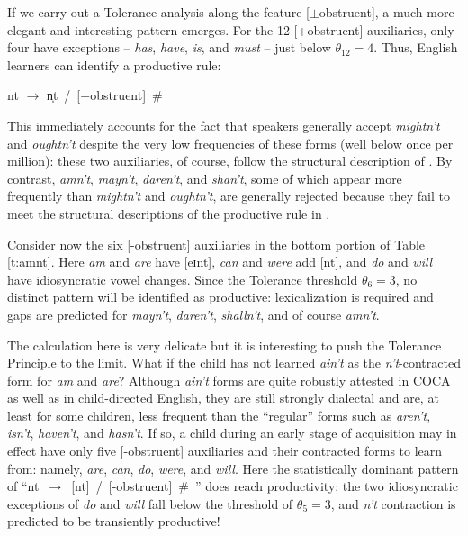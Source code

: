 \documentclass[output=paper,
modfonts
]{LSP/langsci}
\begin{document}
If we carry out a Tolerance analysis along the feature
[$\pm$obstruent], a much more elegant and interesting pattern
emerges. For the 12 [+obstruent] auxiliaries, only four have
exceptions -- \textit{has}, \textit{have}, \textit{  is}, and \textit{must} -- just below $\theta_{12}=4$. Thus, English learners can
identify a productive rule:  

\begin{exe} \ex \label{nt-rule}

nt $\longrightarrow$
n̩t~/~[+obstruent]~\#~\underline{\hspace{0.5cm}} \end{exe}

\noindent This immediately accounts for the  fact that speakers generally
accept \textit{mightn't} and \textit{oughtn't} despite the very low
frequencies of these forms (well below once per million): these two
auxiliaries, of course, follow the structural description of
. By contrast, \textit{amn't}, \textit{mayn't}, 
\textit{daren't}, and \textit{shan't}, some of which 
appear more frequently than \textit{mightn't} and \textit{oughtn't}, are
generally rejected because they fail to meet the structural
descriptions of the productive rule in . 

Consider now the six  [-obstruent] auxiliaries in the bottom portion of Table
\ref{t:amnt}. Here  \textit{am} and \textit{are} have [eɪnt],
\textit{can} and \textit{were} add [nt], and \textit{do} and \textit{will} have
idiosyncratic vowel changes. Since the Tolerance threshold $\theta_6 =
3$, no distinct pattern will  be identified as productive:
lexicalization is required 
and gaps are predicted for \textit{mayn't}, \textit{daren't}, \textit{shalln't}, and of
course \textit{amn't}.  

 The calculation here is very delicate but it is
interesting to push the Tolerance Principle to the limit. 
What if the
child has not learned \textit{ain't} as the \textit{n't}-contracted form for
\textit{am} and \textit{are}? Although \textit{ain't} forms are quite robustly
attested in COCA as well as in child-directed English, they are still
strongly dialectal and are, at least for some children,  less frequent
than the ``regular'' forms such as \textit{
  aren't}, \textit{isn't}, \textit{haven't}, and \textit{hasn't}. If so, a
child during an early stage of acquisition may 
in effect have only five [-obstruent] auxiliaries and their contracted
forms to learn from: namely, \textit{  are}, \textit{can}, \textit{
  do}, \textit{were}, and \textit{will}. Here the statistically dominant
pattern of
``nt~$\longrightarrow$~[nt]~/~[-obstruent]~\#~\underline{\hspace{0.5cm}}''
does reach productivity: the two idiosyncratic exceptions of \textit{do} and
\textit{will} fall below the threshold of $\theta_{5} = 3$, and 
\textit{n't} contraction is predicted to be transiently productive! 
\end{document}
